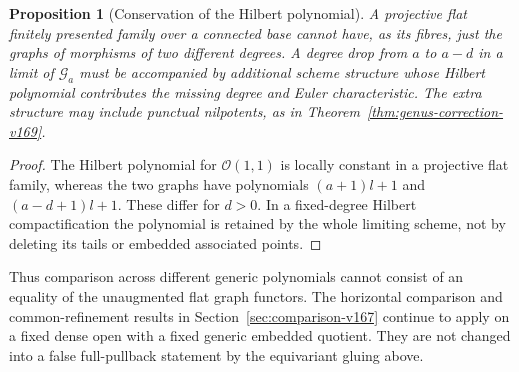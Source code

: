 \documentclass[11pt,reqno]{amsart}
\numberwithin{equation}{section}
\newtheorem{proposition}[theorem]{Proposition}
\theoremstyle{definition}\newtheorem{definition}[theorem]{Definition}
\theoremstyle{remark}\newtheorem{remark}[theorem]{Remark}
\newcommand{\OO}{\mathcal O}\newcommand{\II}{\mathcal I}
\begin{document}
\begin{proposition}[Conservation of the Hilbert polynomial]
\label{prop:conservation-v169}
A projective flat finitely presented family over a connected base
cannot have, as its fibres, just the graphs of morphisms of two
different degrees. A degree drop from $a$ to $a-d$ in a limit of
$\mathcal G_a$ must be accompanied by additional scheme structure
whose Hilbert polynomial contributes the missing degree and Euler
characteristic. The extra structure may include punctual nilpotents,
as in Theorem~\ref{thm:genus-correction-v169}.
\end{proposition}
\begin{proof}
The Hilbert polynomial for $\OO(1,1)$ is locally constant in a
projective flat family, whereas the two graphs have polynomials
$(a+1)l+1$ and $(a-d+1)l+1$. These differ for $d>0$. In a fixed-degree
Hilbert compactification the polynomial is retained by the whole
limiting scheme, not by deleting its tails or embedded associated
points.
\end{proof}
Thus comparison across different generic polynomials cannot consist
of an equality of the unaugmented flat graph functors. The horizontal
comparison and common-refinement results in
Section~\ref{sec:comparison-v167} continue to apply on a fixed dense
open with a fixed generic embedded quotient. They are not changed into
a false full-pullback statement by the equivariant gluing above.
\end{document}
